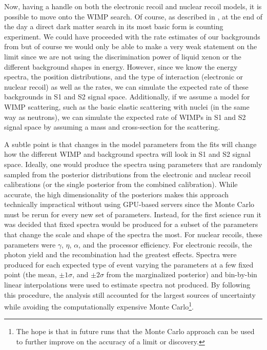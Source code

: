 Now, having a handle on both the electronic recoil and nuclear recoil models, it is possible to move onto the WIMP search.  Of course, as described in , at the end of the day a direct dark matter search in its most basic form is counting experiment.  We could have proceeded with the rate estimates of our backgrounds from  but of course we would only be able to make a very weak statement on the limit since we are not using the discrimination power of liquid xenon or the different background shapes in energy.  However, since we know the energy spectra, the position distributions, and the type of interaction (electronic or nuclear recoil) as well as the rates, we can simulate the expected rate of these backgrounds in S1 and S2 signal space.  Additionally, if we assume a model for WIMP scattering, such as the basic elastic scattering with nuclei (in the same way as neutrons), we can simulate the expected rate of WIMPs in S1 and S2 signal space by assuming a mass and cross-section for the scattering.  

A subtle point is that changes in the model parameters from the fits will change how the different WIMP and background spectra will look in S1 and S2 signal space.  Ideally, one would produce the spectra using parameters that are randomly sampled from the posterior distributions from the electronic and nuclear recoil calibrations (or the single posterior from the combined calibration).  While accurate, the high dimensionality of the posteriors makes this approach technically impractical without using GPU-based servers since the Monte Carlo must be rerun for every new set of parameters.  Instead, for the first science run it was decided that fixed spectra would be produced for a subset of the parameters that change the scale and shape of the spectra the most.  For nuclear recoils, these parameters were $\gamma$, $\eta$, $\alpha$, and the processor efficiency.  For electronic recoils, the photon yield and the recombination had the greatest effects.  Spectra were produced for each expected type of event varying the parameters at a few fixed point (the mean, $\pm 1 \sigma$, and $\pm 2 \sigma$ from the marginalized posterior) and bin-by-bin linear interpolations were used to estimate spectra not produced.  By following this procedure, the analysis still accounted for the largest sources of uncertainty while avoiding the computationally expensive Monte Carlo\footnote{The hope is that in future runs that the Monte Carlo approach can be used to further improve on the accuracy of a limit or discovery.}.

